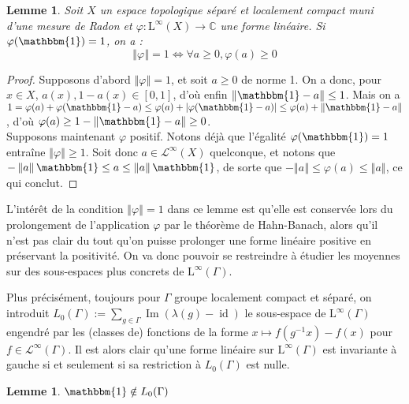 \documentclass[a4paper,12pt]{article}
\newtheorem{lemma}[theorem]{Lemme}
\newcommand{\C}{\mathbb{C}}
\newcommand{\norm}[1]{\left\Vert #1\right\Vert}
\newcommand{\abs}[1]{\left\vert#1\right\vert}
\newcommand{\indic}{\mathbbm{1}}
\newcommand{\ssi}{si et seulement si }
\newcommand{\inv}{^{-1}}
\renewcommand{\iff}{\Leftrightarrow}
\DeclareMathOperator{\id}{id}
\DeclareMathOperator{\Ima}{Im}
\begin{document}
\begin{lemma}\label{positive_iff_norm}
    Soit $X$ un espace topologique séparé et localement compact muni d'une mesure de Radon et $\varphi:\mathrm{L}^\infty(X)\to\C$ une forme linéaire. 
    Si $\varphi(\indic) = 1$, on a :
    \begin{equation*}
        \norm{\varphi} = 1 \iff \forall a \ge 0, \varphi(a) \geq 0
    \end{equation*}
\end{lemma}

\begin{proof}
    Supposons d'abord $\norm{\varphi} = 1$, et soit $a\ge 0$ de norme 1. On a donc, pour $x\in X$, $a(x), 1-a(x)\in[0,1]$,
    d'où enfin $\norm{\indic-a}\le 1$. Mais on a $1 = \varphi(a) + \varphi(\indic-a) \le \varphi(a) + \abs{\varphi(\indic-a)} \le \varphi(a) + \norm{\indic - a}$, d'où
    $\varphi(a)\ge 1 - \norm{\indic-a}\ge0$. \\
    Supposons maintenant $\varphi$ positif. Notons déjà que l'égalité $\varphi(\indic) = 1$ entraîne $\norm{\varphi}\ge1$. Soit donc $a\in\mathscr{L}^\infty(X)$ quelconque,
    et notons que $-\norm{a}\indic\le a\le\norm{a}\indic$, de sorte que $-\norm{a}\le\varphi(a)\le\norm{a}$, ce qui conclut.
\end{proof}

L'intérêt de la condition $\norm\varphi = 1$ dans ce lemme est qu'elle est conservée lors du prolongement de l'application $\varphi$ par le théorème
de Hahn-Banach, alors qu'il n'est pas clair du tout qu'on puisse prolonger une forme linéaire positive en préservant la positivité. On va donc pouvoir se restreindre
à étudier les moyennes sur des sous-espaces plus concrets de $\mathrm{L}^\infty(\Gamma)$.

Plus précisément, toujours pour $\Gamma$ groupe localement compact et séparé, on introduit $L_0(\Gamma) := \sum_{g\in\Gamma} \Ima(\lambda(g) - \id)$ le sous-espace de 
$\mathrm{L}^\infty(\Gamma)$ engendré par les (classes de) fonctions de la forme $x\mapsto f(g\inv x) - f(x)$ pour $f\in\mathscr{L}^\infty(\Gamma)$. 
Il est alors clair qu'une forme linéaire sur $\mathrm{L}^\infty(\Gamma)$ est invariante à gauche \ssi sa restriction à $L_0(\Gamma)$ est nulle. 

\begin{lemma}
    $\indic\notin L_0(\Gamma)$
\end{lemma}
\end{document}

